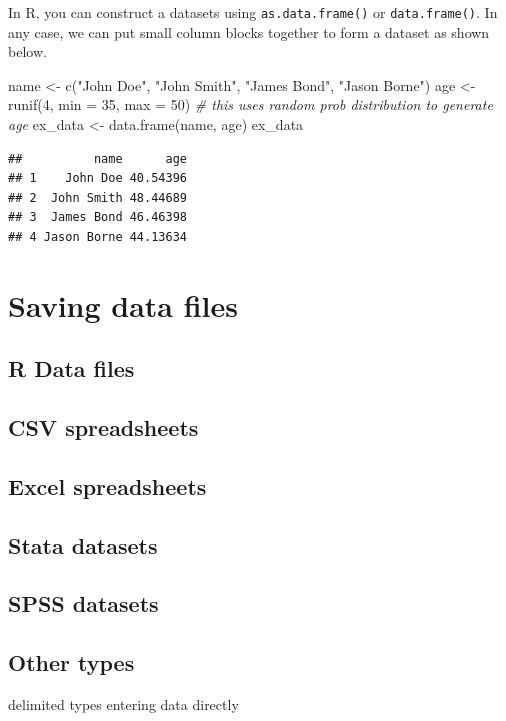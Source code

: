 \documentclass[
]{book}
\newenvironment{Shaded}{\begin{snugshade}}{\end{snugshade}}
\newcommand{\AttributeTok}[1]{\textcolor[rgb]{0.77,0.63,0.00}{#1}}
\newcommand{\CommentTok}[1]{\textcolor[rgb]{0.56,0.35,0.01}{\textit{#1}}}
\newcommand{\DecValTok}[1]{\textcolor[rgb]{0.00,0.00,0.81}{#1}}
\newcommand{\FunctionTok}[1]{\textcolor[rgb]{0.00,0.00,0.00}{#1}}
\newcommand{\NormalTok}[1]{#1}
\newcommand{\OtherTok}[1]{\textcolor[rgb]{0.56,0.35,0.01}{#1}}
\newcommand{\StringTok}[1]{\textcolor[rgb]{0.31,0.60,0.02}{#1}}
\begin{document}
In R, you can construct a datasets using \texttt{as.data.frame()} or \texttt{data.frame()}. In any case, we can put small column blocks together to form a dataset as shown below.

\begin{Shaded}
\begin{Highlighting}[]
\NormalTok{name }\OtherTok{\textless{}{-}} \FunctionTok{c}\NormalTok{(}\StringTok{"John Doe"}\NormalTok{, }\StringTok{"John Smith"}\NormalTok{, }\StringTok{"James Bond"}\NormalTok{, }\StringTok{"Jason Borne"}\NormalTok{)}
\NormalTok{age }\OtherTok{\textless{}{-}} \FunctionTok{runif}\NormalTok{(}\DecValTok{4}\NormalTok{, }\AttributeTok{min =} \DecValTok{35}\NormalTok{, }\AttributeTok{max =} \DecValTok{50}\NormalTok{) }\CommentTok{\# this uses random prob distribution to generate age}
\NormalTok{ex\_data }\OtherTok{\textless{}{-}} \FunctionTok{data.frame}\NormalTok{(name, age)}
\NormalTok{ex\_data}
\end{Highlighting}
\end{Shaded}

\begin{verbatim}
##          name      age
## 1    John Doe 40.54396
## 2  John Smith 48.44689
## 3  James Bond 46.46398
## 4 Jason Borne 44.13634
\end{verbatim}

\hypertarget{saving-data-files}{%
\section{Saving data files}\label{saving-data-files}}

\hypertarget{r-data-files}{%
\subsection{R Data files}\label{r-data-files}}

\hypertarget{csv-spreadsheets}{%
\subsection{CSV spreadsheets}\label{csv-spreadsheets}}

\hypertarget{excel-spreadsheets-1}{%
\subsection{Excel spreadsheets}\label{excel-spreadsheets-1}}

\hypertarget{stata-datasets-1}{%
\subsection{Stata datasets}\label{stata-datasets-1}}

\hypertarget{spss-datasets-1}{%
\subsection{SPSS datasets}\label{spss-datasets-1}}

\hypertarget{other-types}{%
\subsection{Other types}\label{other-types}}

delimited types
entering data directly

  
\end{document}
